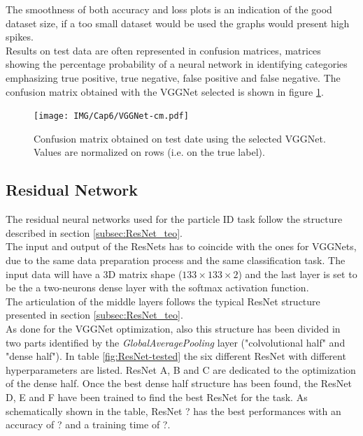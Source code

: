 The smoothness of both accuracy and loss plots is an indication of the good dataset size, if a too small dataset would be used the graphs would present high spikes.\\

Results on test data are often represented in confusion matrices, matrices showing the percentage probability of a neural network in identifying categories emphasizing true positive, true negative, false positive and false negative. The confusion matrix obtained with the VGGNet selected is shown in figure \ref{fig:VGGNet-cm}.

\begin{figure}
	\centering
	\texttt{[image: IMG/Cap6/VGGNet-cm.pdf]}
	\caption{Confusion matrix obtained on test date  using the selected VGGNet. Values are normalized on rows (i.e. on the true label).}
	\label{fig:VGGNet-cm}
\end{figure}

\subsection{Residual Network}
The residual neural networks used for the particle ID task follow the structure described in section \ref{subsec:ResNet_teo}.\\
The input and output of the ResNets has to coincide with the ones for VGGNets, due to the same data preparation process and the same classification task. The input data will have a 3D matrix shape ($133\times 133\times 2$) and the last layer is set to be the a two-neurons dense layer with the softmax activation function.\\
The articulation of the middle layers follows the typical ResNet structure presented in section \ref{subsec:ResNet_teo}.\\
As done for the VGGNet optimization, also this structure has been divided in two parts identified by the \textit{GlobalAveragePooling} layer ("colvolutional half" and "dense half"). In table \ref{fig:ResNet-tested} the six different ResNet with different hyperparameters are listed. ResNet A, B and C are dedicated to the optimization of the dense half. Once the best dense half structure has been found, the ResNet D, E and F have been trained to find the best ResNet for the task. As schematically shown in the table, ResNet ? has the best performances with an accuracy of ? and a training time of ?.\\


